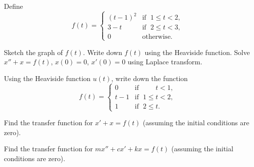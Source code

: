 \begin{exercise}
Define
\begin{equation*}
f(t) =
\begin{cases}
{(t-1)}^2 & \text{if } \; 1 \leq t < 2, \\
3-t & \text{if } \; 2 \leq t < 3, \\
0 & \text{otherwise} .
\end{cases}
\end{equation*}
\begin{tasks}
\task Sketch the graph of $f(t)$.
\task Write down $f(t)$ using the Heaviside function.
\task Solve $x''+x=f(t)$, $x(0)=0$, $x'(0) = 0$ using Laplace transform.
\end{tasks}
\end{exercise}

\begin{exercise}
	Using the Heaviside function $u(t)$, write down the function
	\begin{equation*}
	f(t) =
	\begin{cases}
	0 & \text{if } \; \phantom{1 \leq {}} t < 1  , \\
	t-1 & \text{if } \; 1 \leq t < 2 , \\
	1 & \text{if } \; 2 \leq t .
	\end{cases}
	\end{equation*}
\end{exercise}

\begin{exercise}
	Find the transfer function for 
	$x' + x = f(t)$
	(assuming the initial conditions are zero).
\end{exercise}

\begin{exercise}
Find the transfer function for 
$m x'' + c x' + kx = f(t)$
(assuming the initial conditions are zero).
\end{exercise}



